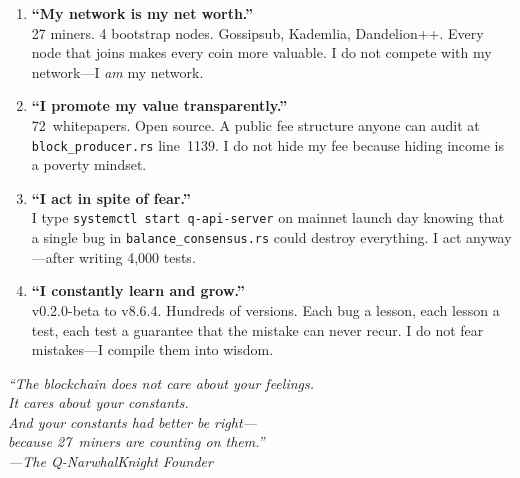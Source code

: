 \documentclass[11pt,a4paper]{article}
\begin{document}
\begin{declaration}[title={\textbf{The Quantum Millionaire's Ten Declarations}}]
\begin{enumerate}[leftmargin=2em, itemsep=0.6em]
\item \textbf{``My network is my net worth.''}\\
27 miners. 4 bootstrap nodes. Gossipsub, Kademlia, Dandelion++. Every
node that joins makes every coin more valuable. I do not compete with my
network---I \emph{am} my network.

\item \textbf{``I promote my value transparently.''}\\
72~whitepapers. Open source. A public fee structure anyone can audit at
\texttt{block\_producer.rs} line~1139. I do not hide my fee because
hiding income is a poverty mindset.

\item \textbf{``I act in spite of fear.''}\\
I type \texttt{systemctl start q-api-server} on mainnet launch day
knowing that a single bug in \texttt{balance\_consensus.rs} could destroy
everything. I act anyway---after writing 4{,}000 tests.

\item \textbf{``I constantly learn and grow.''}\\
v0.2.0-beta to v8.6.4. Hundreds of versions. Each bug a lesson, each
lesson a test, each test a guarantee that the mistake can never recur.
I do not fear mistakes---I compile them into wisdom.

\end{enumerate}
\end{declaration}

\vspace{1cm}

\begin{center}
\end{center}

\vspace{0.3cm}

\begin{center}
\large\itshape\color{qnkblue}
``The blockchain does not care about your feelings.\\
It cares about your constants.\\[0.3cm]
And your constants had better be right---\\
because 27~miners are counting on them.''\\[0.5cm]
\normalsize\upshape\color{gray}
---The Q-NarwhalKnight Founder
\end{center}
\end{document}
